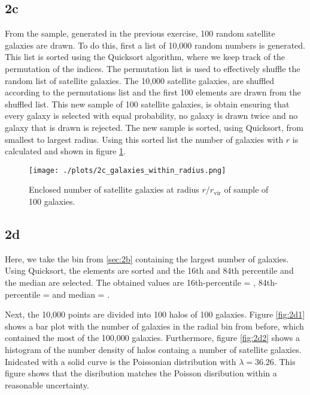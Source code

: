 \subsection*{2c}
From the sample, generated in the previous exercise, 100 random satellite galaxies are drawn. To do this, first a list of 10,000 random numbers is generated. This list is sorted using the Quicksort algorithm, where we keep track of the permutation of the indices. The permutation list is used to effectively shuffle the random list of satellite galaxies. The 10,000 satellite galaxies, are shuffled according to the permutations list and the first 100 elements are drawn from the shuffled list. This new sample of 100 satellite galaxies, is obtain ensuring that every galaxy is selected with equal probability, no galaxy is drawn twice and no galaxy that is drawn is rejected. The new sample is sorted, using Quicksort, from smallest to largest radius. Using this sorted list the number of galaxies with $r$ is calculated and shown in figure \ref{fig:2c}.

\begin{figure}[!ht]
  \centering
  \texttt{[image: ./plots/2c\_galaxies\_within\_radius.png]}
  \caption{Enclosed number of satellite galaxies at radius $r/r_\mathrm{vir}$ of sample of 100 galaxies.}
  \label{fig:2c}
\end{figure}

\subsection*{2d}
Here, we take the bin from \ref{sec:2b} containing the largest number of galaxies. Using Quicksort, the elements are sorted and the 16th and 84th percentile and the median are selected. The obtained values are 16th-percentile = , 84th-percentile =  and median = .

Next, the 10,000 points are divided into 100 halos of 100 galaxies. Figure \ref{fig:2d1} shows a bar plot with the number of galaxies in the radial bin from before, which contained the most of the 100,000 galaxies. Furthermore, figure \ref{fig:2d2} shows a histogram of the number density of halos containg a number of satellite galaxies. Inidcated with a solid curve is the Poissonian distribution with $\lambda =  36.26$. This figure shows that the disribution matches the Poisson disribution within a reasonable uncertainty. 

